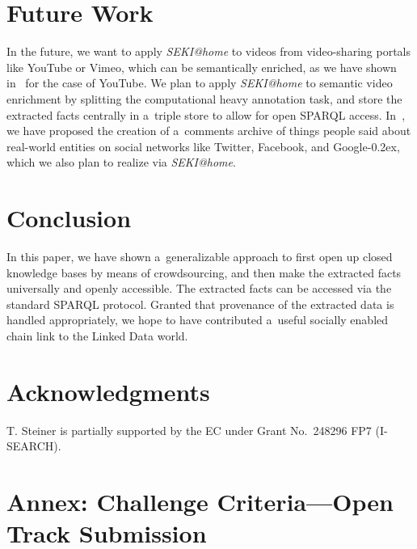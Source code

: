 \documentclass[runningheads,a4paper]{llncs}
\newcommand{\googleplus}{Google\nolinebreak\hspace{0em}\raisebox{.28ex}{\tiny\bf +}\kern-0.2ex\xspace}
\begin{document}
\section{Future Work} \label{sec:future-work}
In the future, we want to apply \emph{SEKI@home} to
videos from video-sharing portals like YouTube or Vimeo, which can be semantically enriched,
as we have shown in~\cite{steiner2010} for the case of YouTube.
We plan to apply \emph{SEKI@home} to semantic video enrichment by splitting
the computational heavy annotation task,
and store the extracted facts centrally in a~triple store
to allow for open SPARQL access.
In~\cite{steiner2012}, we have proposed the creation of
a~comments archive of things people said about real-world entities
on social networks like Twitter, Facebook, and \googleplus,
which we also plan to realize via \emph{SEKI@home}.

\section{Conclusion}
In this paper, we have shown a~generalizable approach
to first open up closed knowledge bases by means of crowdsourcing,
and then make the extracted facts universally and openly accessible.
The extracted facts can be accessed via the standard SPARQL protocol.
Granted that provenance of the extracted data is handled appropriately,
we hope to have contributed a~useful socially enabled chain link
to the Linked Data world.

\section*{Acknowledgments}
\small
T. Steiner is partially supported by the EC
under Grant No.~248296 FP7 (\mbox{I-SEARCH}).

\newpage




\newpage

\section*{Annex: Challenge Criteria---Open Track Submission}
\end{document}
